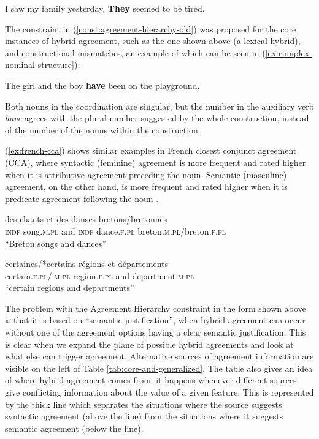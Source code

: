 \begin{exe}
  \ex\label{ex:family-pron}
  I saw my family yesterday. \textbf{They} seemed to be tired.
\end{exe}

The constraint in (\ref{const:agreement-hierarchy-old}) was proposed for the core instances of hybrid agreement, such as the one shown above (a lexical hybrid), and constructional mismatches, an example of which can be seen in (\ref{ex:complex-nominal-structure}).

\begin{exe}
  \ex\label{ex:complex-nominal-structure}
  The girl and the boy \textbf{have} been on the playground.
\end{exe}

Both nouns in the coordination are singular, but the number in the auxiliary verb \textsl{have} agrees with the plural number suggested by the whole construction, instead of the number of the nouns within the construction.

(\ref{ex:french-cca}) shows similar examples in French closest conjunct agreement (CCA), where syntactic (feminine) agreement is more frequent and rated higher when it is attributive agreement preceding the noun. Semantic (masculine) agreement, on the other hand, is more frequent and rated higher when it is predicate agreement following the noun \citep{an_closest_2022, abeille2022accord}. 

\begin{exe}
  \ex\label{ex:french-cca}
  \begin{xlist}
    \ex
    \gll des chants et des danses bretons/bretonnes\\
    \textsc{indf} song\textsc{.m.pl} and \textsc{indf} dance\textsc{.f.pl} breton\textsc{.m.pl}/breton\textsc{.f.pl}\\
    \glt ``Breton songs and dances''

    \ex
    \gll certaines/*certains régions et départements\\
    certain\textsc{.f.pl/.m.pl} region\textsc{.f.pl} and department\textsc{.m.pl}\\
    \glt ``certain regions and departments''
  \end{xlist}
\end{exe}

The problem with the Agreement Hierarchy constraint in the form shown above is that it is based on ``semantic justification'', when hybrid agreement can occur without one of the agreement options having a clear semantic justification. This is clear when we expand the plane of possible hybrid agreements and look at what else can trigger agreement. Alternative sources of agreement information are visible on the left of Table \ref{tab:core-and-generalized}. The table also gives an idea of where hybrid agreement comes from: it happens whenever different sources give conflicting information about the value of a given feature. This is represented by the thick line which separates the situations where the source suggests syntactic agreement (above the line) from the situations where it suggests semantic agreement (below the line).

